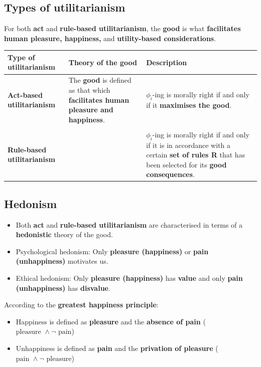 \documentclass[11pt]{article}
\begin{document}
\subsection{Types of utilitarianism}
\label{sec:org3e8f60e}
For both \textbf{act} and \textbf{rule-based utilitarianism}, the \textbf{good} is what \textbf{facilitates human pleasure, happiness,} and \textbf{utility-based considerations}.
\begin{center}
\begin{tabularx}{\textwidth}{|X|X|X|}
\hline
Type of utilitarianism & Theory of the good & Description\\
\hline
\textbf{Act-based utilitarianism} & The \textbf{good} is defined as that which \textbf{facilitates human pleasure and happiness}. & \(\phi_i\)-ing is morally right if and only if it \textbf{maximises the good}.\\
 &  & \\
\textbf{Rule-based utilitarianism} &  & \(\phi_i\)-ing is morally right if and only if it is in accordance with a certain \textbf{set of rules R} that has been selected for its \textbf{good consequences}.\\
\hline
\end{tabularx}
\end{center}
\subsection{Hedonism}
\label{sec:orgc78a228}
\begin{itemize}
\item Both \textbf{act} and \textbf{rule-based utilitarianism} are characterised in terms of a \textbf{hedonistic} theory of the good.
\item Psychological hedonism: Only \textbf{pleasure (happiness)} or \textbf{pain (unhappiness)} motivates us.
\item Ethical hedonism: Only \textbf{pleasure (happiness)} has \textbf{value} and only \textbf{pain (unhappiness)} has \textbf{disvalue}.
\end{itemize}

According to the \textbf{greatest happiness principle}:
\begin{itemize}
\item Happiness is defined as \textbf{pleasure} and the \textbf{absence of pain} (\(\text{pleasure } \wedge \neg \text{ pain}\))
\item Unhappiness is defined as \textbf{pain} and the \textbf{privation of pleasure} (\(\text{pain } \wedge \neg \text{ pleasure}\))
\end{itemize}
\end{document}
